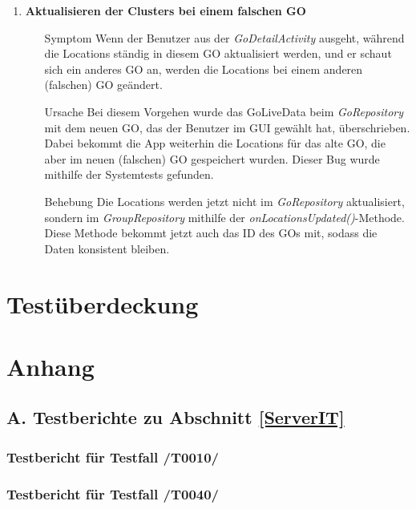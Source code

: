 \documentclass[11pt,a4paper]{scrartcl}
\def\threedigits#1{%
  \ifnum#1<100 0\fi
  \ifnum#1<10 0\fi
  \number#1}
\begin{document}
\begin{enumerate}[label={\textbf{/B\protect\threedigits{\theenumi}0/}}, leftmargin=*]
\item \textbf{Aktualisieren der Clusters bei einem falschen GO}
	\begin{itemize}
		\item[Symptom] Wenn der Benutzer aus der \textit{GoDetailActivity} ausgeht, während die Locations ständig in diesem GO aktualisiert werden, und er schaut sich ein anderes GO an, werden die Locations bei einem anderen (falschen) GO geändert.
		\item[Ursache] Bei diesem Vorgehen wurde das GoLiveData beim \textit{GoRepository} mit dem neuen GO, das der Benutzer im GUI gewählt hat, überschrieben. Dabei bekommt die App weiterhin die Locations für das alte GO, die aber im neuen (falschen) GO gespeichert wurden. Dieser Bug wurde mithilfe der Systemtests gefunden.
		\item[Behebung] Die Locations werden jetzt nicht im \textit{GoRepository} aktualisiert, sondern im \textit{GroupRepository} mithilfe der \textit{onLocationsUpdated()}-Methode. Diese Methode bekommt jetzt auch das ID des GOs mit, sodass die Daten konsistent bleiben.
	\end{itemize}

\end{enumerate}

\newpage

\section{Testüberdeckung}

\newpage

\section{Anhang}

\subsection{A. Testberichte zu Abschnitt \ref{ServerIT}}

\subsubsection{Testbericht für Testfall /T0010/}

\newpage
\subsubsection{Testbericht für Testfall /T0040/}
\end{document}
